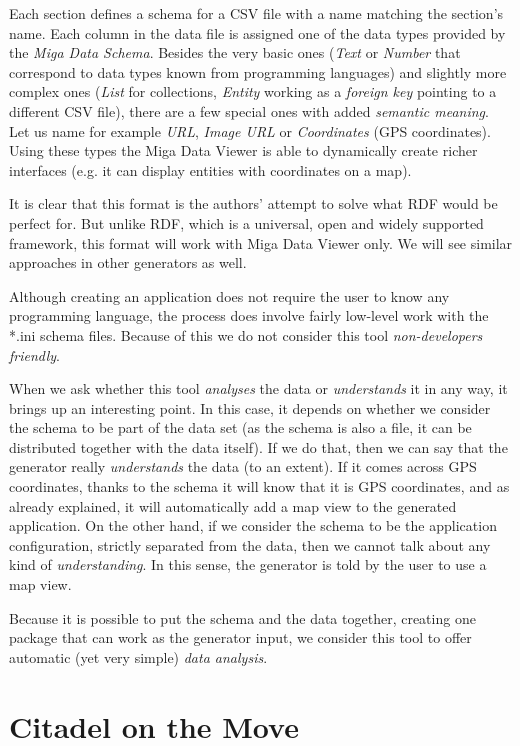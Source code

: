 Each section defines a schema for a CSV file with a name matching the section's name. Each column in the data file is assigned one of the data types provided by the \emph{Miga Data Schema}. Besides the very basic ones (\emph{Text} or \emph{Number} that correspond to data types known from programming languages) and slightly more complex ones (\emph{List} for collections, \emph{Entity} working as a \emph{foreign key} pointing to a different CSV file), there are a few special ones with added \emph{semantic meaning}. Let us name for example \emph{URL}, \emph{Image URL} or \emph{Coordinates} (GPS coordinates). Using these types the Miga Data Viewer is able to dynamically create richer interfaces (e.g. it can display entities with coordinates on a map).

It is clear that this format is the authors' attempt to solve what RDF would be perfect for. But unlike RDF, which is a universal, open and widely supported framework, this format will work with Miga Data Viewer only. We will see similar approaches in other generators as well.

Although creating an application does not require the user to know any programming language, the process does involve fairly low-level work with the *.ini schema files. Because of this we do not consider this tool \emph{non-developers friendly}.

When we ask whether this tool \emph{analyses} the data or \emph{understands} it in any way, it brings up an interesting point. In this case, it depends on whether we consider the schema to be part of the data set (as the schema is also a file, it can be distributed together with the data itself). If we do that, then we can say that the generator really \emph{understands} the data (to an extent). If it comes across GPS coordinates, thanks to the schema it will know that it is GPS coordinates, and as already explained, it will automatically add a map view to the generated application. On the other hand, if we consider the schema to be the application configuration, strictly separated from the data, then we cannot talk about any kind of \emph{understanding}. In this sense, the generator is told by the user to use a map view.

Because it is possible to put the schema and the data together, creating one package that can work as the generator input, we consider this tool to offer automatic (yet very simple) \emph{data analysis}.

\section{Citadel on the Move}

